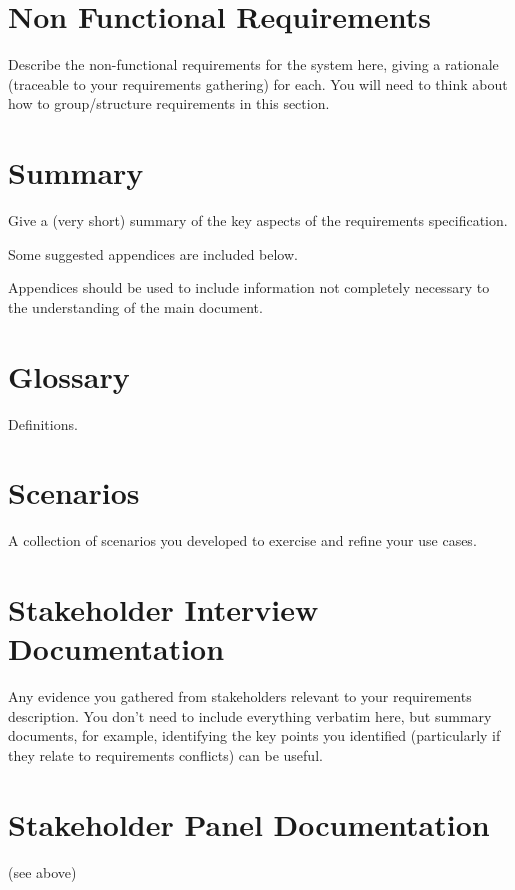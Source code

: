 \documentclass{l3deliverable}
\begin{document}
\section{Non Functional Requirements}

Describe the non-functional requirements for the system here, giving a
rationale (traceable to your requirements gathering) for each.  You
will need to think about how to group/structure requirements in this
section.


\section{Summary}

Give a (very short) summary of the key aspects of the requirements
specification.


\appendix

Some suggested appendices are included below.

Appendices should be used to include information not completely
necessary to the understanding of the main document.

\section{Glossary}

Definitions.

\section{Scenarios}

A collection of scenarios you developed to exercise and refine your
use cases.

\section{Stakeholder Interview Documentation}

Any evidence you gathered from stakeholders relevant to your
requirements description.  You don't need to include everything
verbatim here, but summary documents, for example, identifying the key
points you identified (particularly if they relate to requirements
conflicts) can be useful.

\section{Stakeholder Panel Documentation}

(see above)

\end{document}
